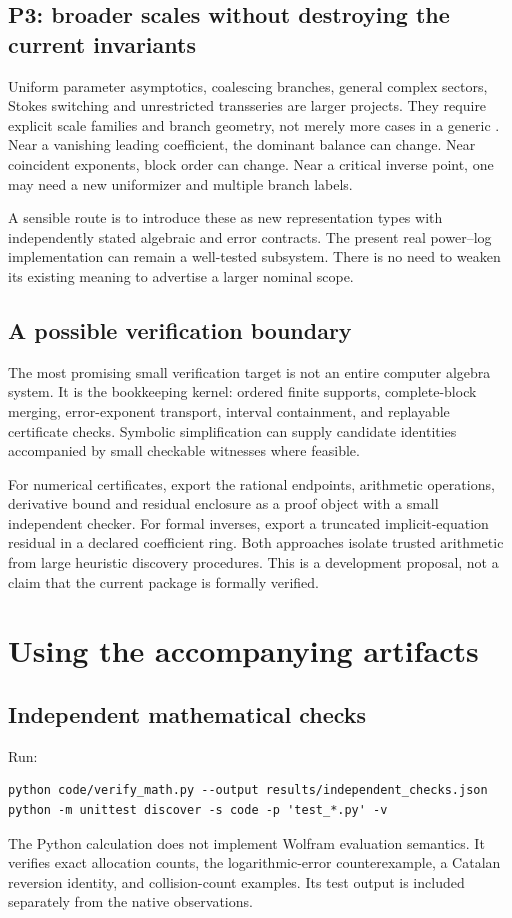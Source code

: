\documentclass[11pt,a4paper]{article}
\newcommand{\code}[1]{\texttt{\detokenize{#1}}}
\begin{document}
\subsection{P3: broader scales without destroying the current invariants}
Uniform parameter asymptotics, coalescing branches, general complex sectors, Stokes switching and unrestricted transseries are larger projects. They require explicit scale families and branch geometry, not merely more cases in a generic \code{Switch}. Near a vanishing leading coefficient, the dominant balance can change. Near coincident exponents, block order can change. Near a critical inverse point, one may need a new uniformizer and multiple branch labels.

A sensible route is to introduce these as new representation types with independently stated algebraic and error contracts. The present real power--log implementation can remain a well-tested subsystem. There is no need to weaken its existing meaning to advertise a larger nominal scope.

\subsection{A possible verification boundary}
The most promising small verification target is not an entire computer algebra system. It is the bookkeeping kernel: ordered finite supports, complete-block merging, error-exponent transport, interval containment, and replayable certificate checks. Symbolic simplification can supply candidate identities accompanied by small checkable witnesses where feasible.

For numerical certificates, export the rational endpoints, arithmetic operations, derivative bound and residual enclosure as a proof object with a small independent checker. For formal inverses, export a truncated implicit-equation residual in a declared coefficient ring. Both approaches isolate trusted arithmetic from large heuristic discovery procedures. This is a development proposal, not a claim that the current package is formally verified.

\section{Using the accompanying artifacts}

\subsection{Independent mathematical checks}
Run:
\begin{lstlisting}
python code/verify_math.py --output results/independent_checks.json
python -m unittest discover -s code -p 'test_*.py' -v
\end{lstlisting}
The Python calculation does not implement Wolfram evaluation semantics. It verifies exact allocation counts, the logarithmic-error counterexample, a Catalan reversion identity, and collision-count examples. Its test output is included separately from the native observations.
\end{document}
